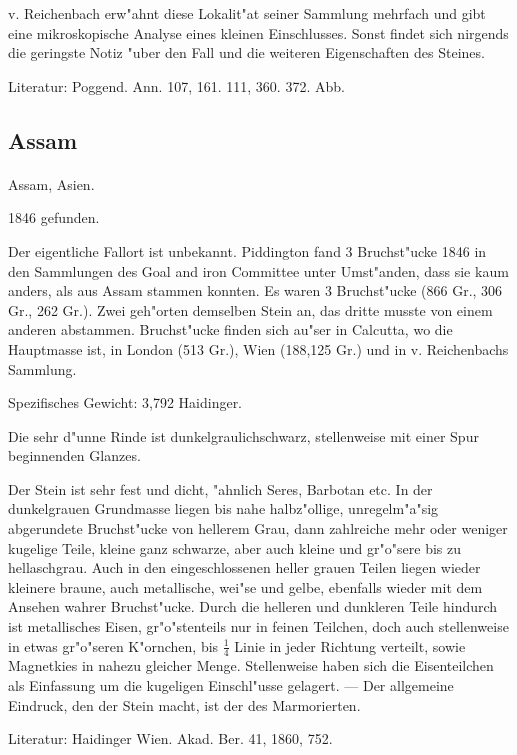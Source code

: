 \documentclass[a4paper, 11pt, oneside]{article}
\begin{document}
v. Reichenbach erw"ahnt diese Lokalit"at seiner Sammlung mehrfach und gibt eine mikroskopische Analyse eines kleinen Einschlusses. Sonst findet sich nirgends die geringste Notiz "uber den Fall und die weiteren Eigenschaften des Steines.

\footnotesize
Literatur: Poggend. Ann. 107, 161. 111, 360. 372. Abb.

\subsection{Assam}
\normalsize
\paragraph{}
Assam, Asien.

1846 gefunden.

Der eigentliche Fallort ist unbekannt. Piddington fand 3 Bruchst"ucke 1846 in den Sammlungen des Goal and iron Committee unter Umst"anden, dass sie kaum anders, als aus Assam stammen konnten. Es waren 3 Bruchst"ucke (866 Gr., 306 Gr., 262 Gr.). Zwei geh"orten demselben Stein an, das dritte musste von einem anderen abstammen. Bruchst"ucke finden sich au"ser in Calcutta, wo die Hauptmasse ist, in London (513 Gr.), Wien (188,125 Gr.) und in v. Reichenbachs Sammlung.

Spezifisches Gewicht: 3,792 Haidinger.

Die sehr d"unne Rinde ist dunkelgraulichschwarz, stellenweise mit einer Spur beginnenden Glanzes.

Der Stein ist sehr fest und dicht, "ahnlich Seres, Barbotan etc. In der dunkelgrauen Grundmasse liegen bis nahe halbz"ollige, unregelm"a"sig abgerundete Bruchst"ucke von hellerem Grau, dann zahlreiche mehr oder weniger kugelige Teile, kleine ganz schwarze, aber auch kleine und gr"o"sere bis zu hellaschgrau. Auch in den eingeschlossenen heller grauen Teilen liegen wieder kleinere braune, auch metallische, wei"se und gelbe, ebenfalls wieder mit dem Ansehen wahrer Bruchst"ucke. Durch die helleren und dunkleren Teile hindurch ist metallisches Eisen, gr"o"stenteils nur in feinen Teilchen, doch auch stellenweise in etwas gr"o"seren K"ornchen, bis $\frac{1}{4}$ Linie in jeder Richtung verteilt, sowie Magnetkies in nahezu gleicher Menge. Stellenweise haben sich die Eisenteilchen als Einfassung um die kugeligen Einschl"usse gelagert. --- Der allgemeine Eindruck, den der Stein macht, ist der des Marmorierten.

\footnotesize
Literatur: Haidinger Wien. Akad. Ber. 41, 1860, 752.
\end{document}

